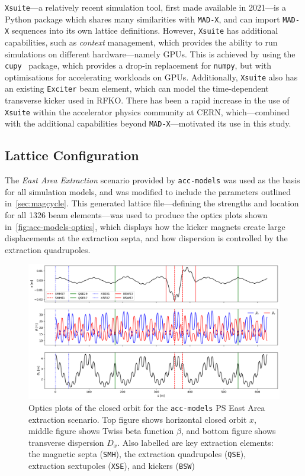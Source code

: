 \documentclass[11pt]{report}
\begin{document}
\verb|Xsuite|---a relatively recent simulation tool, first made available in 2021---is a Python package which shares many similarities with \verb|MAD-X|, and can import \verb|MAD-X| sequences into its own lattice definitions. However, \verb|Xsuite| has additional capabilities, such as \textit{context} management, which provides the ability to run simulations on different hardware---namely GPUs. This is achieved by using the \verb|cupy|~\cite{CuPy} package, which provides a drop-in replacement for \verb|numpy|, but with optimisations for accelerating workloads on GPUs. Additionally, \verb|Xsuite| also has an existing \verb|Exciter| beam element, which can model the time-dependent transverse kicker used in RFKO. There has been a rapid increase in the use of \verb|Xsuite| within the accelerator physics community at CERN, which---combined with the additional capabilities beyond \verb|MAD-X|---motivated its use in this study.

\subsection{Lattice Configuration} %

The \textit{East Area Extraction} scenario provided by \verb|acc-models| was used as the basis for all simulation models, and was modified to include the parameters outlined in~\autoref{sec:magcycle}. This generated lattice file---defining the strengths and location for all 1326 beam elements---was used to produce the optics plots shown in~\autoref{fig:acc-models-optics}, which displays how the kicker magnets create large displacements at the extraction septa, and how dispersion is controlled by the extraction quadrupoles.

\begin{figure}[h]
  \centering
  \includegraphics[width=0.9\linewidth]{optics.png}
  \cprotect\caption{Optics plots of the closed orbit for the \verb|acc-models| PS East Area extraction scenario. Top figure shows horizontal closed orbit $x$, middle figure shows Twiss beta function $\beta$, and bottom figure shows transverse dispersion $D_x$. Also labelled are key extraction elements: the magnetic septa (\verb|SMH|), the extraction quadrupoles (\verb|QSE|), extraction sextupoles (\verb|XSE|), and kickers (\verb|BSW|)}\label{fig:acc-models-optics}
\end{figure}
\end{document}
